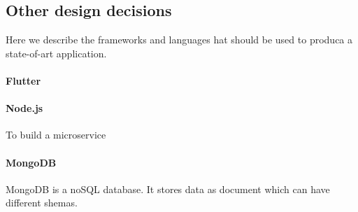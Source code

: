 \subsection{Other design decisions}
Here we describe the frameworks and languages hat should be used to produca a state-of-art application.

\paragraph{Flutter}


\paragraph{Node.js}
To build a microservice

\paragraph{MongoDB}
MongoDB is a noSQL database. It stores data as document which can have different shemas.

